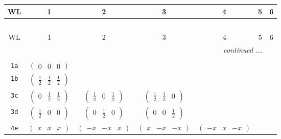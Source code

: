 \documentclass[fleqn,9pt,landscape]{jsarticle}
\begin{document}
\begin{center}
\renewcommand{\arraystretch}{1.2}
\begin{longtable}{ccccccc}
 \hline \hline
WL & 1 & 2 & 3 & 4 & 5 & 6 \\ \hline \endfirsthead

\multicolumn{6}{l}{\tablename\ \thetable{}} \\
 \hline \hline
WL & 1 & 2 & 3 & 4 & 5 & 6 \\ \hline \endhead

 \hline \hline
\multicolumn{6}{r}{\footnotesize\it continued ...} \\ \endfoot

 \hline \hline
\multicolumn{6}{r}{} \\ \endlastfoot

{\tt 1a} & $ \begin{pmatrix} 0 & 0 & 0 \end{pmatrix} $ & $  $ & $  $ & $  $ & $  $ & $  $ \\ \hline
{\tt 1b} & $ \begin{pmatrix} \frac{1}{2} & \frac{1}{2} & \frac{1}{2} \end{pmatrix} $ & $  $ & $  $ & $  $ & $  $ & $  $ \\ \hline
{\tt 3c} & $ \begin{pmatrix} 0 & \frac{1}{2} & \frac{1}{2} \end{pmatrix} $ & $ \begin{pmatrix} \frac{1}{2} & 0 & \frac{1}{2} \end{pmatrix} $ & $ \begin{pmatrix} \frac{1}{2} & \frac{1}{2} & 0 \end{pmatrix} $ & $  $ & $  $ & $  $ \\ \hline
{\tt 3d} & $ \begin{pmatrix} \frac{1}{2} & 0 & 0 \end{pmatrix} $ & $ \begin{pmatrix} 0 & \frac{1}{2} & 0 \end{pmatrix} $ & $ \begin{pmatrix} 0 & 0 & \frac{1}{2} \end{pmatrix} $ & $  $ & $  $ & $  $ \\ \hline
{\tt 4e} & $ \begin{pmatrix} x & x & x \end{pmatrix} $ & $ \begin{pmatrix} - x & - x & x \end{pmatrix} $ & $ \begin{pmatrix} x & - x & - x \end{pmatrix} $ & $ \begin{pmatrix} - x & x & - x \end{pmatrix} $ & $  $ & $  $ \\ \hline

\end{longtable}
\end{center}
\end{document}
